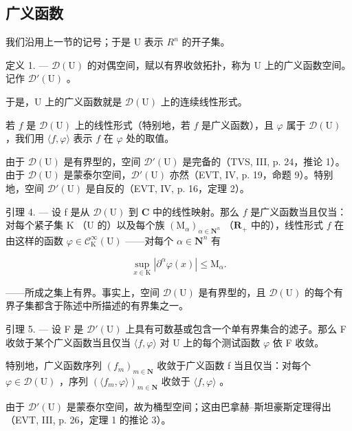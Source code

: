 \subsection{广义函数}

我们沿用上一节的记号；于是 U 表示 \(R^{n}\) 的开子集。

定义 1. --- \(\mathcal{D}(\mathrm{U})\) 的对偶空间，赋以有界收敛拓扑，称为 U 上的广义函数空间。记作 \(\mathcal{D}'(\mathrm{U})\) 。

于是，U 上的广义函数就是 \(\mathcal{D}(\mathrm{U})\) 上的连续线性形式。

若 \(f\) 是 \(\mathcal{D}(\mathrm{U})\) 上的线性形式（特别地，若 \(f\) 是广义函数），且 \(\varphi\) 属于 \(\mathcal{D}(\mathrm{U})\) ，我们用 \(\langle f, \varphi \rangle\) 表示 \(f\) 在 \(\varphi\) 处的取值。

由于 \(\mathcal{D}(\mathrm{U})\) 是有界型的，空间 \(\mathcal{D}'(\mathrm{U})\) 是完备的（TVS, III, p. 24，推论 1）。由于 \(\mathcal{D}(\mathrm{U})\) 是蒙泰尔空间，\(\mathcal{D}'(\mathrm{U})\) 亦然（EVT, IV, p. 19，命题 9）。特别地，空间 \(\mathcal{D}'(\mathrm{U})\) 是自反的（EVT, IV, p. 16，定理 2）。

引理 4. --- 设 f 是从 \(\mathcal{D}(\mathrm{U})\) 到 \(\mathbf{C}\) 中的线性映射。那么 \(f\) 是广义函数当且仅当：对每个紧子集 \(\mathrm{K}\) （\(\mathrm{U}\) 的）以及每个族 \((\mathrm{M}_{\alpha})_{\alpha \in \mathbf{N}^{n}}\) （\(\mathbf{R}_{+}\) 中的），线性形式 \(f\) 在由这样的函数 \(\varphi \in \mathcal{C}_{\mathrm{K}}^{\infty}(\mathrm{U})\) ——对每个 \(\alpha \in \mathbf{N}^{n}\) 有

\[
\sup _ {x \in \mathrm{K}} | \partial^ {\alpha} \varphi (x) | \leqslant \mathrm{M} _ {\alpha}.
\]

——所成之集上有界。事实上，空间 \(\mathcal{D}(\mathrm{U})\) 是有界型的，且 \(\mathcal{D}(\mathrm{U})\) 的每个有界子集都含于陈述中所描述的有界集之一。

引理 5. --- 设 F 是 \(\mathcal{D}'(\mathrm{U})\) 上具有可数基或包含一个单有界集合的滤子。那么 F 收敛于某个广义函数当且仅当 \(\langle f, \varphi \rangle\) 对 U 上的每个测试函数 \(\varphi\) 依 F 收敛。

特别地，广义函数序列 \((f_{m})_{m\in\mathbf{N}}\) 收敛于广义函数 f 当且仅当：对每个 \(\varphi\in\mathcal{D}(\mathrm{U})\) ，序列 \((\langle f_{m},\varphi\rangle)_{m\in\mathbf{N}}\) 收敛于 \(\langle f,\varphi\rangle\) 。

由于 \(\mathcal{D}'(\mathrm{U})\) 是蒙泰尔空间，故为桶型空间；这由巴拿赫–斯坦豪斯定理得出（EVT, III, p. 26，定理 1 的推论 3）。

